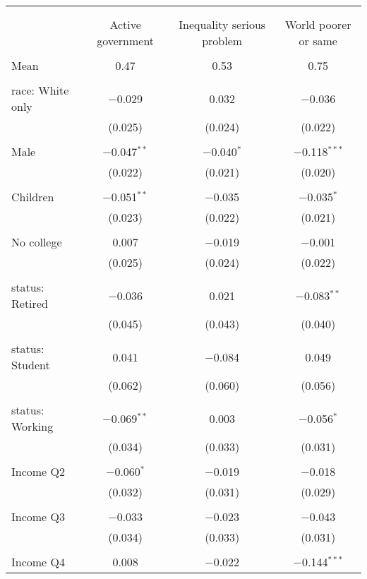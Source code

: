 
\begin{tabular}{@{\extracolsep{5pt}}lccc} 
\\[-1.8ex]\hline 
\hline \\[-1.8ex] 
\\[-1.8ex] & Active government & Inequality serious problem & World poorer or same \\ 
\hline \\[-1.8ex] 
 Mean & 0.47 & 0.53 & 0.75  \\ \hline \\[-1.8ex] race: White only & $-$0.029 & 0.032 & $-$0.036 \\ 
  & (0.025) & (0.024) & (0.022) \\ 
  & & & \\ 
 Male & $-$0.047$^{**}$ & $-$0.040$^{*}$ & $-$0.118$^{***}$ \\ 
  & (0.022) & (0.021) & (0.020) \\ 
  & & & \\ 
 Children & $-$0.051$^{**}$ & $-$0.035 & $-$0.035$^{*}$ \\ 
  & (0.023) & (0.022) & (0.021) \\ 
  & & & \\ 
 No college & 0.007 & $-$0.019 & $-$0.001 \\ 
  & (0.025) & (0.024) & (0.022) \\ 
  & & & \\ 
 status: Retired & $-$0.036 & 0.021 & $-$0.083$^{**}$ \\ 
  & (0.045) & (0.043) & (0.040) \\ 
  & & & \\ 
 status: Student & 0.041 & $-$0.084 & 0.049 \\ 
  & (0.062) & (0.060) & (0.056) \\ 
  & & & \\ 
 status: Working & $-$0.069$^{**}$ & 0.003 & $-$0.056$^{*}$ \\ 
  & (0.034) & (0.033) & (0.031) \\ 
  & & & \\ 
 Income Q2 & $-$0.060$^{*}$ & $-$0.019 & $-$0.018 \\ 
  & (0.032) & (0.031) & (0.029) \\ 
  & & & \\ 
 Income Q3 & $-$0.033 & $-$0.023 & $-$0.043 \\ 
  & (0.034) & (0.033) & (0.031) \\ 
  & & & \\ 
 Income Q4 & 0.008 & $-$0.022 & $-$0.144$^{***}$ \\ 

\end{tabular}
